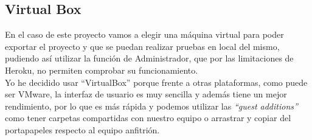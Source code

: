 \subsection{Virtual Box}
En el caso de este proyecto vamos a elegir una máquina virtual para poder exportar el proyecto y que se puedan realizar pruebas en local del mismo, pudiendo así utilizar la función de Administrador, que por las limitaciones de Heroku, no permiten comprobar su funcionamiento.\\ Yo he decidido usar “VirtualBox” porque frente a otras
plataformas, como puede ser VMware, la interfaz de usuario es muy sencilla y además tiene
un mejor rendimiento, por lo que es más rápida y podemos utilizar las \textit{“guest additions”}
como tener carpetas compartidas con nuestro equipo o arrastrar y copiar del
portapapeles respecto al equipo anfitrión.\\
